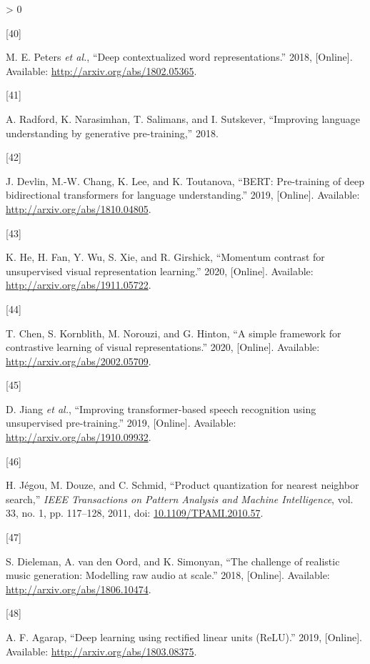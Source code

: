 \documentclass[
  a4paper,
]{article}
\newlength{\cslhangindent}
\newlength{\csllabelwidth}
\newenvironment{CSLReferences}[2] %
 {%
  \setlength{\parindent}{0pt}
  \ifodd #1 \everypar{\setlength{\hangindent}{\cslhangindent}}\ignorespaces\fi
  \ifnum #2 > 0
  \setlength{\parskip}{#2\baselineskip}
  \fi
 }%
 {}
\newcommand{\CSLLeftMargin}[1]{\parbox[t]{\csllabelwidth}{#1}}
\newcommand{\CSLRightInline}[1]{\parbox[t]{\linewidth - \csllabelwidth}{#1}\break}
\begin{document}
\begin{CSLReferences}{0}{0}
\leavevmode\hypertarget{ref-peters2018deep}{}%
\CSLLeftMargin{{[}40{]} }
\CSLRightInline{M. E. Peters \emph{et al.}, {``Deep contextualized word
representations.''} 2018, {[}Online{]}. Available:
\url{http://arxiv.org/abs/1802.05365}.}

\leavevmode\hypertarget{ref-radford2018improving}{}%
\CSLLeftMargin{{[}41{]} }
\CSLRightInline{A. Radford, K. Narasimhan, T. Salimans, and I.
Sutskever, {``Improving language understanding by generative
pre-training,''} 2018.}

\leavevmode\hypertarget{ref-devlin2019bert}{}%
\CSLLeftMargin{{[}42{]} }
\CSLRightInline{J. Devlin, M.-W. Chang, K. Lee, and K. Toutanova,
{``BERT: Pre-training of deep bidirectional transformers for language
understanding.''} 2019, {[}Online{]}. Available:
\url{http://arxiv.org/abs/1810.04805}.}

\leavevmode\hypertarget{ref-he2020momentum}{}%
\CSLLeftMargin{{[}43{]} }
\CSLRightInline{K. He, H. Fan, Y. Wu, S. Xie, and R. Girshick,
{``Momentum contrast for unsupervised visual representation learning.''}
2020, {[}Online{]}. Available: \url{http://arxiv.org/abs/1911.05722}.}

\leavevmode\hypertarget{ref-chen2020simple}{}%
\CSLLeftMargin{{[}44{]} }
\CSLRightInline{T. Chen, S. Kornblith, M. Norouzi, and G. Hinton, {``A
simple framework for contrastive learning of visual representations.''}
2020, {[}Online{]}. Available: \url{http://arxiv.org/abs/2002.05709}.}

\leavevmode\hypertarget{ref-jiang2019improving}{}%
\CSLLeftMargin{{[}45{]} }
\CSLRightInline{D. Jiang \emph{et al.}, {``Improving transformer-based
speech recognition using unsupervised pre-training.''} 2019,
{[}Online{]}. Available: \url{http://arxiv.org/abs/1910.09932}.}

\leavevmode\hypertarget{ref-5432202}{}%
\CSLLeftMargin{{[}46{]} }
\CSLRightInline{H. Jégou, M. Douze, and C. Schmid, {``Product
quantization for nearest neighbor search,''} \emph{IEEE Transactions on
Pattern Analysis and Machine Intelligence}, vol. 33, no. 1, pp.
117--128, 2011, doi:
\href{https://doi.org/10.1109/TPAMI.2010.57}{10.1109/TPAMI.2010.57}.}

\leavevmode\hypertarget{ref-dieleman2018challenge}{}%
\CSLLeftMargin{{[}47{]} }
\CSLRightInline{S. Dieleman, A. van den Oord, and K. Simonyan, {``The
challenge of realistic music generation: Modelling raw audio at
scale.''} 2018, {[}Online{]}. Available:
\url{http://arxiv.org/abs/1806.10474}.}

\leavevmode\hypertarget{ref-agarap2019deep}{}%
\CSLLeftMargin{{[}48{]} }
\CSLRightInline{A. F. Agarap, {``Deep learning using rectified linear
units (ReLU).''} 2019, {[}Online{]}. Available:
\url{http://arxiv.org/abs/1803.08375}.}


\end{CSLReferences}
\end{document}
